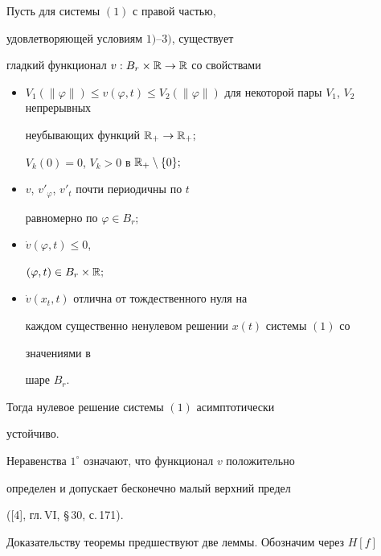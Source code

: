 \begin{thmnonum}


Пусть для системы $(1)$ с правой частью,


удовлетворяющей условиям $1)$--$3)$, существует


гладкий функционал $v: B_r\times\Bbb R\to\Bbb R$ со свойствами


\begin{itemize}


\item[$1^{\circ}$.] $V_1(\|\varphi\|)\leqslant v(\varphi,t)\leqslant


V_2(\|\varphi\|)$ для некоторой пары $V_1$, $V_2$ непрерывных


неубывающих функций $\Bbb R_+\to\Bbb R_+;$


$V_k(0)=0$, $V_k>0$ в $\Bbb R_+\setminus\{0\};$


\item[$2^{\circ}$.] $v$, $v'_{\varphi}$, $v'_t$ почти периодичны по $t$


равномерно по $\varphi\in B_r;$


\item[$3^{\circ}$.] $\Dot v(\varphi,t)\leqslant 0$,


$(\varphi,t)\in B_r\times\Bbb R;$


\item[$4^{\circ}$.] $\Dot v(x_t,t)$ отлична от тождественного нуля на


каждом существенно ненулевом решении $x(t)$ системы $(1)$ со


значениями в


шаре $B_r$.


\end{itemize}


Тогда нулевое решение системы $(1)$ асимптотически


устойчиво.


\end{thmnonum}





Неравенства $1^{\circ}$ означают, что функционал $v$ положительно


определен и допускает бесконечно малый верхний предел


([4], гл.\,VI, \S\,30, с.\,171).





Доказательству теоремы предшествуют две леммы. Обозначим через $H[f]$


